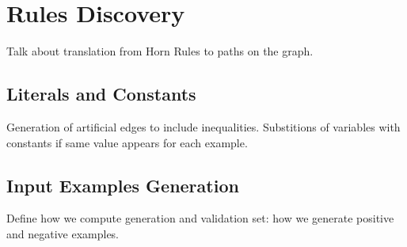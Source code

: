 \section{Rules Discovery}
Talk about translation from Horn Rules to paths on the graph.

\subsection{Literals and Constants}
Generation of artificial edges to include inequalities.
Substitions of variables with constants if same value appears for each example.

\subsection{Input Examples Generation}
Define how we compute generation and validation set: how we generate positive and negative examples.